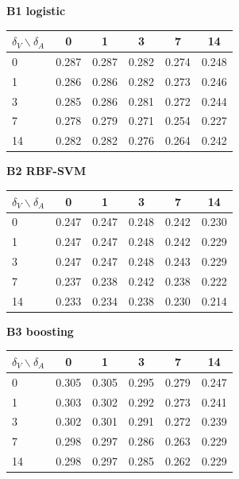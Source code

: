 \begin{minipage}[t]{0.32\linewidth}\centering\footnotesize
\textbf{B1 logistic}\\[3pt]
\setlength{\tabcolsep}{1.9pt}
\begin{tabular}{@{}lccccc@{}}\toprule
$\delta_V\backslash\delta_A$ & 0 & 1 & 3 & 7 & 14 \\ \midrule
0 & 0.287 & 0.287 & 0.282 & 0.274 & 0.248 \\
1 & 0.286 & 0.286 & 0.282 & 0.273 & 0.246 \\
3 & 0.285 & 0.286 & 0.281 & 0.272 & 0.244 \\
7 & 0.278 & 0.279 & 0.271 & 0.254 & 0.227 \\
14 & 0.282 & 0.282 & 0.276 & 0.264 & 0.242 \\
\bottomrule\end{tabular}\end{minipage}\hfill
\begin{minipage}[t]{0.32\linewidth}\centering\footnotesize
\textbf{B2 RBF-SVM}\\[3pt]
\setlength{\tabcolsep}{1.9pt}
\begin{tabular}{@{}lccccc@{}}\toprule
$\delta_V\backslash\delta_A$ & 0 & 1 & 3 & 7 & 14 \\ \midrule
0 & 0.247 & 0.247 & 0.248 & 0.242 & 0.230 \\
1 & 0.247 & 0.247 & 0.248 & 0.242 & 0.229 \\
3 & 0.247 & 0.247 & 0.248 & 0.243 & 0.229 \\
7 & 0.237 & 0.238 & 0.242 & 0.238 & 0.222 \\
14 & 0.233 & 0.234 & 0.238 & 0.230 & 0.214 \\
\bottomrule\end{tabular}\end{minipage}\hfill
\begin{minipage}[t]{0.32\linewidth}\centering\footnotesize
\textbf{B3 boosting}\\[3pt]
\setlength{\tabcolsep}{1.9pt}
\begin{tabular}{@{}lccccc@{}}\toprule
$\delta_V\backslash\delta_A$ & 0 & 1 & 3 & 7 & 14 \\ \midrule
0 & 0.305 & 0.305 & 0.295 & 0.279 & 0.247 \\
1 & 0.303 & 0.302 & 0.292 & 0.273 & 0.241 \\
3 & 0.302 & 0.301 & 0.291 & 0.272 & 0.239 \\
7 & 0.298 & 0.297 & 0.286 & 0.263 & 0.229 \\
14 & 0.298 & 0.297 & 0.285 & 0.262 & 0.229 \\
\bottomrule\end{tabular}\end{minipage}
